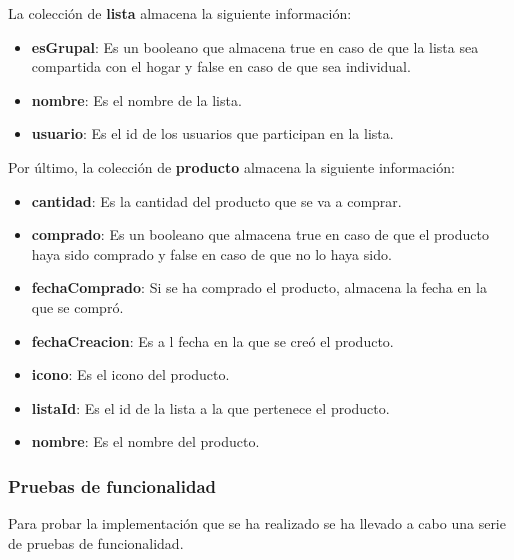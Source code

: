 La colección de \textbf{lista} almacena la siguiente información:

\begin{itemize}
    \item \textbf{esGrupal}: Es un booleano que almacena true en caso de que la lista sea compartida con el hogar y false en caso de que sea individual.
    \item \textbf{nombre}: Es el nombre de la lista.
    \item \textbf{usuario}: Es el id de los usuarios que participan en la lista. 
\end{itemize}


Por último, la colección de \textbf{producto} almacena la siguiente información:

\begin{itemize}
    \item \textbf{cantidad}: Es la cantidad del producto que se va a comprar.
    \item \textbf{comprado}: Es un booleano que almacena true en caso de que el producto haya sido comprado y false en caso de que no lo haya sido.
    \item \textbf{fechaComprado}: Si se ha comprado el producto, almacena la fecha en la que se compró.
    \item \textbf{fechaCreacion}: Es a l fecha en la que se creó el producto.
    \item \textbf{icono}: Es el icono del producto.
    \item \textbf{listaId}: Es el id de la lista a la que pertenece el producto.
    \item \textbf{nombre}: Es el nombre del producto.
\end{itemize}


\subsubsection{Pruebas de funcionalidad}

Para probar la implementación que se ha realizado se ha llevado a cabo una serie de pruebas de funcionalidad.

